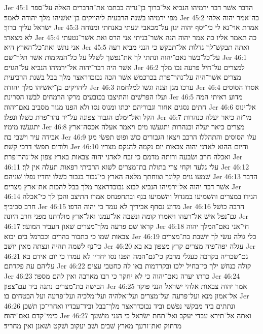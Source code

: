 Jer 45:1  הדבר אשׁר דבר ירמיהו הנביא אל־ברוך בן־נריה בכתבו את־הדברים האלה על־ספר מפי ירמיהו בשׁנה הרבעית ליהויקים בן־יאשׁיהו מלך יהודה לאמר׃
Jer 45:2  כה־אמר יהוה אלהי ישׂראל עליך ברוך׃
Jer 45:3  אמרת אוי־נא לי כי־יסף יהוה יגון על־מכאבי יגעתי באנחתי ומנוחה לא מצאתי׃
Jer 45:4  כה תאמר אליו כה אמר יהוה הנה אשׁר־בניתי אני הרס ואת אשׁר־נטעתי אני נתשׁ ואת־כל־הארץ היא׃
Jer 45:5  ואתה תבקשׁ־לך גדלות אל־תבקשׁ כי הנני מביא רעה על־כל־בשׂר נאם־יהוה ונתתי לך את־נפשׁך לשׁלל על כל־המקמות אשׁר תלך־שׁם׃
Jer 46:1  אשׁר היה דבר־יהוה אל־ירמיהו הנביא על־הגוים׃
Jer 46:2  למצרים על־חיל פרעה נכו מלך מצרים אשׁר־היה על־נהר־פרת בכרכמשׁ אשׁר הכה נבוכדראצר מלך בבל בשׁנת הרביעית ליהויקים בן־יאשׁיהו מלך יהודה׃
Jer 46:3  ערכו מגן וצנה וגשׁו למלחמה׃
Jer 46:4  אסרו הסוסים ועלו הפרשׁים והתיצבו בכובעים מרקו הרמחים לבשׁו הסרינת׃
Jer 46:5  מדוע ראיתי המה חתים נסגים אחור וגבוריהם יכתו ומנוס נסו ולא הפנו מגור מסביב נאם־יהוה׃
Jer 46:6  אל־ינוס הקל ואל־ימלט הגבור צפונה על־יד נהר־פרת כשׁלו ונפלו׃
Jer 46:7  מי־זה כיאר יעלה כנהרות יתגעשׁו מימיו׃
Jer 46:8  מצרים כיאר יעלה וכנהרות יתגעשׁו מים ויאמר אעלה אכסה־ארץ אבידה עיר וישׁבי בה׃
Jer 46:9  עלו הסוסים והתהללו הרכב ויצאו הגבורים כושׁ ופוט תפשׂי מגן ולודים תפשׂי דרכי קשׁת׃
Jer 46:10  והיום ההוא לאדני יהוה צבאות יום נקמה להנקם מצריו ואכלה חרב ושׂבעה ורותה מדמם כי זבח לאדני יהוה צבאות בארץ צפון אל־נהר־פרת׃
Jer 46:11  עלי גלעד וקחי צרי בתולת בת־מצרים לשׁוא הרביתי רפאות תעלה אין לך׃
Jer 46:12  שׁמעו גוים קלונך וצוחתך מלאה הארץ כי־גבור בגבור כשׁלו יחדיו נפלו שׁניהם׃
Jer 46:13  הדבר אשׁר דבר יהוה אל־ירמיהו הנביא לבוא נבוכדראצר מלך בבל להכות את־ארץ מצרים׃
Jer 46:14  הגידו במצרים והשׁמיעו במגדול והשׁמיעו בנף ובתחפנחס אמרו התיצב והכן לך כי־אכלה חרב סביביך׃
Jer 46:15  מדוע נסחף אביריך לא עמד כי יהוה הדפו׃
Jer 46:16  הרבה כושׁל גם־נפל אישׁ אל־רעהו ויאמרו קומה ונשׁבה אל־עמנו ואל־ארץ מולדתנו מפני חרב היונה׃
Jer 46:17  קראו שׁם פרעה מלך־מצרים שׁאון העביר המועד׃
Jer 46:18  חי־אני נאם־המלך יהוה צבאות שׁמו כי כתבור בהרים וככרמל בים יבוא׃
Jer 46:19  כלי גולה עשׂי לך יושׁבת בת־מצרים כי־נף לשׁמה תהיה ונצתה מאין יושׁב׃
Jer 46:20  עגלה יפה־פיה מצרים קרץ מצפון בא בא׃
Jer 46:21  גם־שׂכריה בקרבה כעגלי מרבק כי־גם־המה הפנו נסו יחדיו לא עמדו כי יום אידם בא עליהם עת פקדתם׃
Jer 46:22  קולה כנחשׁ ילך כי־בחיל ילכו ובקרדמות באו לה כחטבי עצים׃
Jer 46:23  כרתו יערה נאם־יהוה כי לא יחקר כי רבו מארבה ואין להם מספר׃
Jer 46:24  הבישׁה בת־מצרים נתנה ביד עם־צפון׃
Jer 46:25  אמר יהוה צבאות אלהי ישׂראל הנני פוקד אל־אמון מנא ועל־פרעה ועל־מצרים ועל־אלהיה ועל־מלכיה ועל־פרעה ועל הבטחים בו׃
Jer 46:26  ונתתים ביד מבקשׁי נפשׁם וביד נבוכדראצר מלך־בבל וביד־עבדיו ואחרי־כן תשׁכן כימי־קדם נאם־יהוה׃
Jer 46:27  ואתה אל־תירא עבדי יעקב ואל־תחת ישׂראל כי הנני מושׁעך מרחוק ואת־זרעך מארץ שׁבים ושׁב יעקוב ושׁקט ושׁאנן ואין מחריד׃
